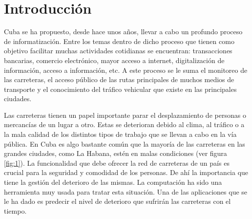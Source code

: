 \chapter*{Introducción}\label{chapter:introduction}

Cuba se ha propuesto, desde hace unos años, llevar a cabo un profundo proceso de informatización.
Entre los temas dentro de dicho proceso que tienen como objetivo facilitar muchas actividades
cotidianas se encuentran: transacciones bancarias, comercio electrónico, mayor acceso a internet, digitalización
de información, acceso a información, etc. A este proceso se le suma el monitoreo de las carreteras, 
el acceso público de las rutas principales de muchos medios de transporte y el conocimiento del tráfico vehicular
que existe en las principales ciudades.

Las carreteras tienen un papel importante parar el desplazamiento 
de personas o mercancías de un lugar a otro. Estas se deterioran debido al clima, al tráfico o a la mala calidad de 
los distintos tipos de trabajo que se llevan a cabo en la vía pública. En Cuba es algo bastante común que la mayoría de 
las carreteras en las grandes ciudades, como La Habana, estén en malas condiciones (ver figura \ref{fig:1}). 
La funcionalidad que debe ofrecer la red de carreteras de un país es crucial para la seguridad y comodidad de los personas. 
De ahí la importancia que tiene la gestión del deterioro de las mismas. La computación ha sido una herramienta muy usada 
para tratar esta situación. Una de las aplicaciones que se le ha dado es predecir el nivel de deterioro que sufrirán 
las carreteras con el tiempo.  


